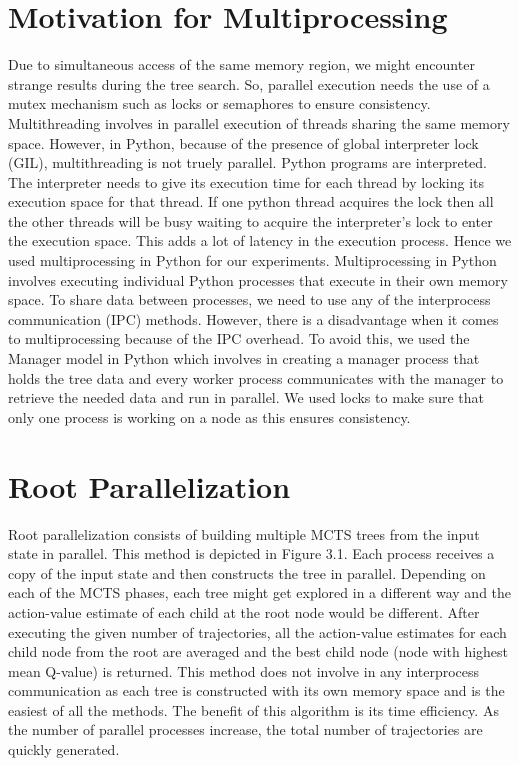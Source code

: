 \documentclass[double,12pt]{beavtex}
\begin{document}
\section {Motivation for Multiprocessing}
Due to simultaneous access of the same memory region, we might encounter strange results during the tree search. So, parallel execution needs the use of a mutex mechanism such as locks or semaphores to ensure consistency. Multithreading involves in parallel execution of threads sharing the same memory space. However, in Python, because of the presence of global interpreter lock (GIL), multithreading is not truely parallel. Python programs are interpreted. The interpreter needs to give its execution time for each thread by locking its execution space for that thread. If one python thread acquires the lock then all the other threads will be busy waiting to acquire the interpreter's lock to enter the execution space. This adds a lot of latency in the execution process. Hence we used multiprocessing in Python for our experiments. Multiprocessing in Python involves executing individual Python processes that execute in their own memory space. To share data between processes, we need to use any of the interprocess communication (IPC) methods. However, there is a disadvantage when it comes to multiprocessing because of the IPC overhead. To avoid this, we used the Manager model in Python which involves in creating a manager process that holds the tree data and every worker process communicates with the manager to retrieve the needed data and run in parallel. We used locks to make sure that only one process is working on a node as this ensures consistency.


\section{Root Parallelization}
Root parallelization consists of building multiple MCTS trees from the input state in parallel. This method is depicted in Figure 3.1. Each process receives a copy of the input state and then constructs the tree in parallel. Depending on each of the MCTS phases, each tree might get explored in a different way and the action-value estimate of each child at the root node would be different. After executing the given number of trajectories, all the action-value estimates for each child node from the root are averaged and the best child node (node with highest mean Q-value) is returned. This method does not involve in any interprocess communication as each tree is constructed with its own memory space and is the easiest of all the methods. The benefit of this algorithm is its time efficiency. As the number of parallel processes increase, the total number of trajectories are quickly generated. 
\end{document}
